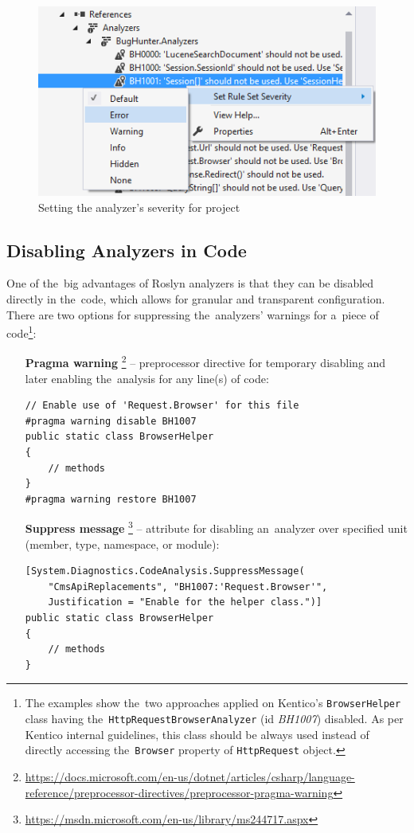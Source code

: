 \documentclass[
  digital, %
  table,   %
  lof,     %
  lot,     %
  oneside,
]{fithesis3}
\begin{document}
\begin{figure}[h!]
		\centering
			\includegraphics[scale=0.85]{img/rule-set-severity}
		\caption{Setting the analyzer's severity for project}
		\label{fig:setting-analyzer-severity}
\end{figure}

\newpage
\subsection{Disabling Analyzers in Code}
One of the~big advantages of Roslyn analyzers is that they can be disabled directly in the~code, which allows for granular and transparent configuration. There are two options for suppressing the~analyzers' warnings for a~piece of code\footnote{The examples show the~two approaches applied on Kentico's \texttt{BrowserHelper} class having the~\texttt{HttpRequestBrowserAnalyzer} (id \textit{BH1007}) disabled. As per Kentico internal guidelines, this class should be always used instead of directly accessing the~\texttt{Browser} property of \texttt{HttpRequest} object.}:

\begin{itemize}
  \item[\textbf{Pragma warning}]\footnote{\url{https://docs.microsoft.com/en-us/dotnet/articles/csharp/language-reference/preprocessor-directives/preprocessor-pragma-warning}} -- preprocessor directive for temporary disabling and later enabling the~analysis for any line(s) of code:

\begin{verbatim}
// Enable use of 'Request.Browser' for this file
#pragma warning disable BH1007 
public static class BrowserHelper
{
    // methods
}
#pragma warning restore BH1007
\end{verbatim}
  
  \item[\textbf{Suppress message}]\footnote{\url{https://msdn.microsoft.com/en-us/library/ms244717.aspx}} -- attribute for disabling an~analyzer over specified unit (member, type, namespace, or module):

\begin{verbatim}
[System.Diagnostics.CodeAnalysis.SuppressMessage(
    "CmsApiReplacements", "BH1007:'Request.Browser'", 
    Justification = "Enable for the helper class.")]
public static class BrowserHelper
{
    // methods
}
\end{verbatim}
  
\end{itemize}
\end{document}
